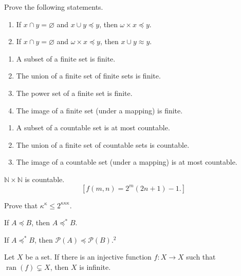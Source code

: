 \documentclass{ctexart}
\newif\ifpreface
\begin{document}
\large
\setlength{\baselineskip}{1.2em}
\ifpreface

\else
\maketitle
\fi
{}
\begin{problem}
Prove the following statements.
\begin{enumerate}
\item If $x \cap y=\varnothing$ and $x \cup y \preccurlyeq y$, then $\omega \times x \preccurlyeq y$.
\item If $x \cap y=\varnothing$ and $\omega \times x \preccurlyeq y$, then $x \cup y \approx y$.
\end{enumerate}
\end{problem}
\newcommand{\peq}{\preccurlyeq}

\begin{problem}
\begin{enumerate}[ref=\theproblem.\arabic*]
\item\label{it:2.1} A subset of a finite set is finite.
\item\label{it:2.2} The union of a finite set of finite sets is finite.
\item The power set of a finite set is finite.
\item The image of a finite set (under a mapping) is finite.
\end{enumerate}
\end{problem}


\begin{problem}
\begin{enumerate}
\item A subset of a countable set is at most countable.
\item The union of a finite set of countable sets is countable.
\item The image of a countable set (under a mapping) is at most countable.
\end{enumerate}
\end{problem}


\begin{problem}
$\mathbb{N} \times \mathbb{N}$ is countable.
$$
\left[f(m, n)=2^m(2 n+1)-1 .\right]
$$
\end{problem}


\begin{problem}
Prove that $\kappa^\kappa \leq 2^{\kappa \kappa \kappa}$.
\end{problem}

\begin{problem}
If $A \preccurlyeq B$, then $A \preccurlyeq^* B$.
\end{problem}

\begin{problem}
If $A \preccurlyeq^* B$, then $\mathscr{P}(A) \preccurlyeq \mathscr{P}(B) .^2$
\end{problem}

\begin{problem}
Let $X$ be a set. If there is an injective function $f: X \rightarrow X$ such that $\operatorname{ran}(f) \subsetneq X$, then $X$ is infinite.
\end{problem}
\end{document}
